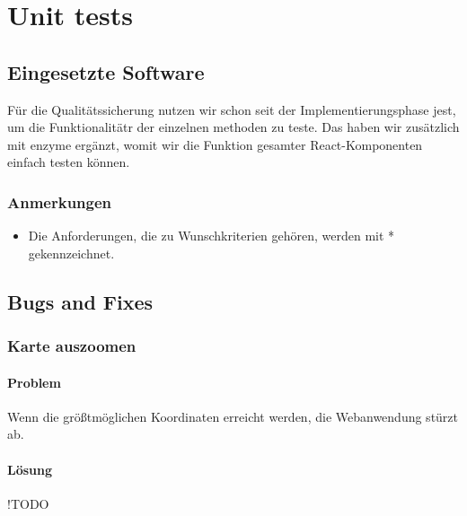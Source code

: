 \section{Unit tests}

\subsection{Eingesetzte Software}

Für die Qualitätssicherung nutzen wir schon seit der Implementierungsphase jest, um die Funktionalitätr der einzelnen methoden zu teste. Das haben wir zusätzlich mit enzyme ergänzt, womit wir die Funktion gesamter React-Komponenten einfach testen können.

\subsubsection{Anmerkungen}
\begin{itemize}
  \item Die Anforderungen, die zu Wunschkriterien gehören, werden mit * gekennzeichnet.
\end{itemize}

\subsection{Bugs and Fixes}

\subsubsection{Karte auszoomen}
\paragraph{Problem}
Wenn die größtmöglichen Koordinaten erreicht werden, die Webanwendung stürzt ab.

\paragraph{Lösung}
!TODO


